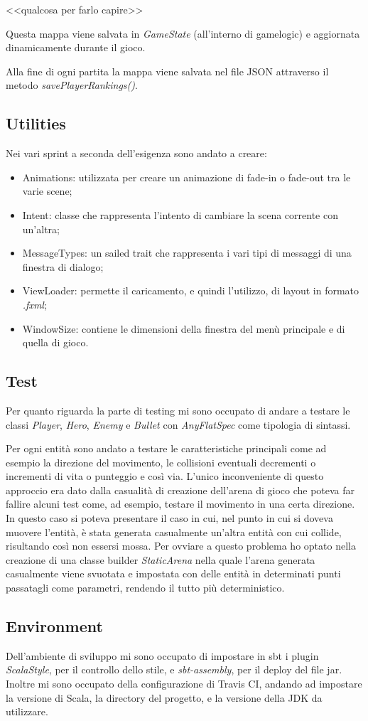 <<qualcosa per farlo capire>>

Questa mappa viene salvata in \textit{GameState} (all'interno di gamelogic) e aggiornata dinamicamente durante il gioco.

Alla fine di ogni partita la mappa viene salvata nel file JSON attraverso il metodo \textit{savePlayerRankings()}.

\subsection{Utilities}
Nei vari sprint a seconda dell'esigenza sono andato a creare:
\begin{itemize}
	\item Animations: utilizzata per creare un animazione di fade-in o fade-out tra le varie scene;
	\item Intent: classe che rappresenta l'intento di cambiare la scena corrente con un'altra;
	\item MessageTypes: un sailed trait che rappresenta i vari tipi di messaggi di una finestra di dialogo;
	\item ViewLoader: permette il caricamento, e quindi l'utilizzo, di layout in formato \textit{.fxml};
	\item WindowSize: contiene le dimensioni della finestra del menù principale e di quella di gioco.
		
\end{itemize}

\subsection{Test}
Per quanto riguarda la parte di testing mi sono occupato di andare a testare le classi \textit{Player}, \textit{Hero}, \textit{Enemy} e \textit{Bullet} con \textit{AnyFlatSpec} come tipologia di sintassi.

Per ogni entità sono andato a testare le caratteristiche principali come ad esempio la direzione del movimento, le collisioni eventuali decrementi o incrementi di vita o punteggio e così via.
L'unico inconveniente di questo approccio era dato dalla casualità di creazione dell'arena di gioco che poteva far fallire alcuni test come, ad esempio, testare il movimento in una certa direzione.
In questo caso si poteva presentare il caso in cui, nel punto in cui si doveva muovere l'entità, è stata generata casualmente un'altra entità con cui collide, risultando così non essersi mossa.
Per ovviare a questo problema ho optato nella creazione di una classe builder \textit{StaticArena} nella quale l'arena generata casualmente viene svuotata e impostata con delle entità in determinati punti passatagli come parametri, rendendo il tutto più deterministico.

\subsection{Environment}
Dell'ambiente di sviluppo mi sono occupato di impostare in sbt i plugin \textit{ScalaStyle}, per il controllo dello stile, e \textit{sbt-assembly}, per il deploy del file jar.
Inoltre mi sono occupato della configurazione di Travis CI, andando ad impostare la versione di Scala, la directory del progetto, e la versione della JDK da utilizzare.
